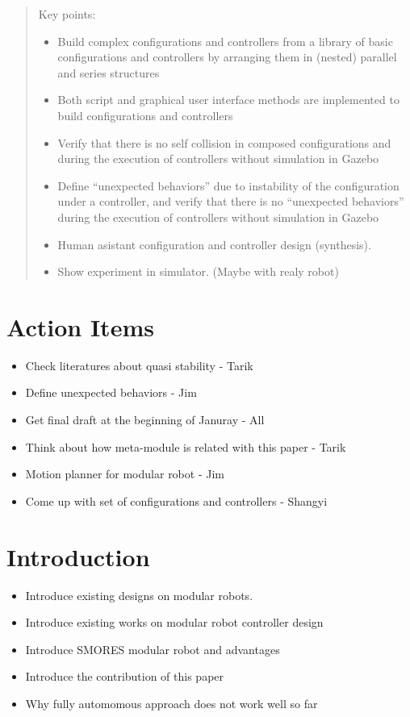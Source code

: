 \documentclass[12pt]{article}
\begin{document}
\maketitle

\begin{abstract}
Key points:
\begin{itemize}
\item Build complex configurations and controllers from a library of basic configurations and controllers by arranging them in (nested) parallel and series structures
\item Both script and graphical user interface methods are implemented to build configurations and controllers
\item Verify that there is no self collision in composed configurations and during the execution  of controllers without simulation in Gazebo
\item Define ``unexpected behaviors'' due to instability of the configuration under a controller, and verify that there is no ``unexpected behaviors'' during the execution of controllers without simulation in Gazebo
\item Human asistant configuration and controller design (synthesis).
\item Show experiment in simulator. (Maybe with realy robot)
\end{itemize}
\end{abstract}

\section{Action Items}
\begin{itemize}
\item Check literatures about quasi stability - Tarik
\item Define unexpected behaviors - Jim
\item Get final draft at the beginning of Januray - All
\item Think about how meta-module is related with this paper - Tarik
\item Motion planner for modular robot - Jim
\item Come up with set of configurations and controllers - Shangyi
\end{itemize}

\section{Introduction}
\begin{itemize}
\item Introduce existing designs on modular robots.
\item Introduce existing works on modular robot controller design
\item Introduce SMORES modular robot and advantages
\item Introduce the contribution of this paper
\item Why fully automomous approach does not work well so far
\end{itemize}
\end{document}
